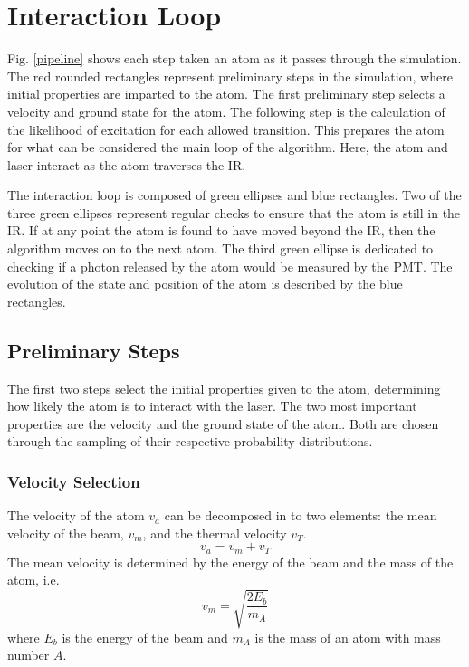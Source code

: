 \label{pip}


\section{Interaction Loop}


Fig. \ref{pipeline} shows each step taken an atom as it passes through the simulation. The red rounded rectangles represent preliminary steps in the simulation, where initial properties are imparted to the atom. The first preliminary step selects a velocity and ground state for the atom. The following step is the calculation of the likelihood of excitation for each allowed transition. This prepares the atom for what can be considered the main loop of the algorithm. Here, the atom and laser interact as the atom traverses the IR. 

The interaction loop is composed of green ellipses and blue rectangles. Two of the three green ellipses represent regular checks to ensure that the atom is still in the IR. If at any point the atom is found to have moved beyond the IR, then the algorithm moves on to the next atom. The third green ellipse is dedicated to checking if a photon released by the atom would be measured by the PMT. The evolution of the state and position of the atom is described by the blue rectangles. 

\subsection{Preliminary Steps}
The first two steps select the initial properties given to the atom, determining how likely the atom is to interact with the laser. The two most important properties are the velocity and the ground state of the atom. Both are chosen through the sampling of their respective probability distributions.

\subsubsection{Velocity Selection}

The velocity of the atom $v_a$ can be decomposed in to two elements: the mean velocity of the beam, $v_{m}$, and the thermal velocity $v_{T}$. 
\begin{equation}
v_a = v_m + v_T
\end{equation}
The mean velocity is determined by the energy of the beam and the mass of the atom, i.e.
\begin{equation}
v_{m} = \sqrt{\frac{2E_b}{m_A}}
\end{equation}
where $E_b$ is the energy of the beam and $m_A$ is the mass of an atom with mass number $A$.

